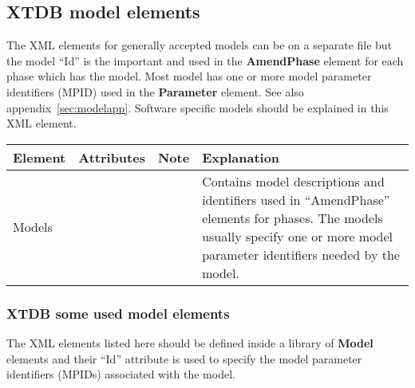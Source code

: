 \documentclass{article}
\begin{document}
\subsection{XTDB model elements}\label{sec:models}

The XML elements for generally accepted models can be on a separate
file but the model ``Id'' is the important and used in the {\bf
  AmendPhase} element for each phase which has the model.  Most model
has one or more model parameter identifiers (MPID) used in the {\bf
  Parameter} element.  See also appendix~\ref{sec:modelapp}.  Software
specific models should be explained in this XML element.

\bigskip
\begin{tabular}{|p{} p{} r p{}|}\hline
  Element & Attributes & Note & Explanation\\\hline

  Models   & && Contains model descriptions and identifiers used in ``AmendPhase'' elements for phases.  The models usually specify one or more model parameter identifiers needed by the model.\\\hline
\end{tabular}


\subsubsection{XTDB some used model elements}

The XML elements listed here should be defined inside a library of
{\bf Model} elements and their ``Id'' attribute is used to specify the
model parameter identifiers (MPIDs) associated with the model.
\end{document}
